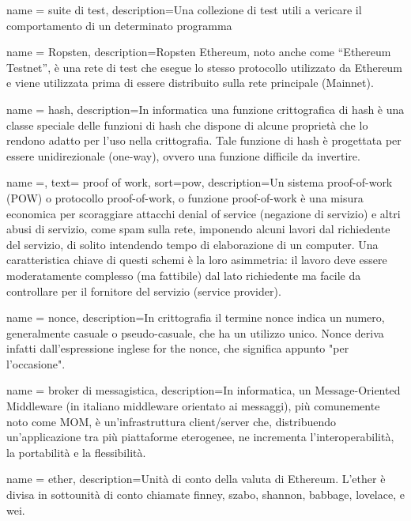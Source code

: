 {
    name = {suite di test},
    description={Una collezione di test utili a vericare il comportamento di un determinato programma}
}

{
    name = {Ropsten},
    description={Ropsten Ethereum, noto anche come “Ethereum Testnet”, è una rete di test che esegue lo stesso protocollo utilizzato da Ethereum e viene utilizzata prima di essere distribuito sulla rete principale (Mainnet).}
}


{
    name = {hash},
    description={In informatica una funzione crittografica di hash è una classe speciale delle funzioni di hash che dispone di alcune proprietà che lo rendono adatto per l'uso nella crittografia. Tale funzione di hash è progettata per essere unidirezionale (one-way), ovvero una funzione difficile da invertire. }
}


{
    name =,
    text= {proof of work},
    sort=pow,
    description={Un sistema proof-of-work (POW) o protocollo proof-of-work, o funzione proof-of-work è una misura economica per scoraggiare attacchi denial of service (negazione di servizio) e altri abusi di servizio, come spam sulla rete, imponendo alcuni lavori dal richiedente del servizio, di solito intendendo tempo di elaborazione di un computer. Una caratteristica chiave di questi schemi è la loro asimmetria: il lavoro deve essere moderatamente complesso (ma fattibile) dal lato richiedente ma facile da controllare per il fornitore del servizio (service provider). }
}


{
    name = {nonce},
    description={In crittografia il termine nonce indica un numero, generalmente casuale o pseudo-casuale, che ha un utilizzo unico. Nonce deriva infatti dall'espressione inglese for the nonce, che significa appunto "per l'occasione".}
}


{
    name = {broker di messagistica},
    description={In informatica, un Message-Oriented Middleware (in italiano middleware orientato ai messaggi), più comunemente noto come MOM, è un'infrastruttura client/server che, distribuendo un'applicazione tra più piattaforme eterogenee, ne incrementa l'interoperabilità, la portabilità e la flessibilità. }
}



{
    name = {ether},
    description={Unità di conto della valuta di Ethereum.  L'ether è divisa in sottounità di conto chiamate finney, szabo, shannon, babbage, lovelace, e wei.}
}


